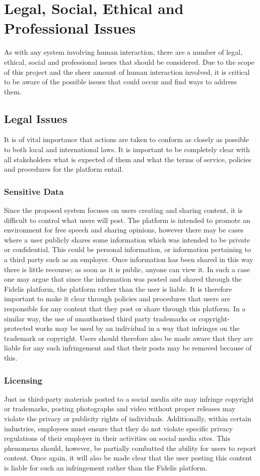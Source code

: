 \chapter{Legal, Social, Ethical and Professional Issues}
\label{Chapter:Issues}
As with any system involving human interaction, there are a number of legal, ethical, social and professional issues that should be considered. Due to the scope of this project and the sheer amount of human interaction involved, it is critical to be aware of the possible issues that could occur and find ways to address them.

\section{Legal Issues}
It is of vital importance that actions are taken to conform as closely as possible to both local and international laws. It is important to be completely clear with all stakeholders what is expected of them and what the terms of service, policies and procedures for the platform entail.

\subsection{Sensitive Data}
Since the proposed system focuses on users creating and sharing content, it is difficult to control what users will post. The platform is intended to promote an environment for free speech and sharing opinions, however there may be cases where a user publicly shares some information which was intended to be private or confidential. This could be personal information, or information pertaining to a third party such as an employer. Once information has been shared in this way there is little recourse; as soon as it is public, anyone can view it. In such a case one may argue that since the information was posted and shared through the Fidelis platform, the platform rather than the user is liable. It is therefore important to make it clear through policies and procedures that users are responsible for any content that they post or share through this platform. In a similar way, the use of unauthorised third party trademarks or copyright-protected works may be used by an individual in a way that infringes on the trademark or copyright. Users should therefore also be made aware that they are liable for any such infringement and that their posts may be removed because of this.

\subsection{Licensing}
Just as third-party materials posted to a social media site may infringe copyright or trademarks, posting photographs and video without proper releases may violate the privacy or publicity rights of individuals. Additionally, within certain industries, employees must ensure that they do not violate specific privacy regulations of their employer in their activities on social media sites. This phenomena should, however, be partially combatted the ability for users to report content. Once again, it will also be made clear that the user posting this content is liable for such an infringement rather than the Fidelis platform.

